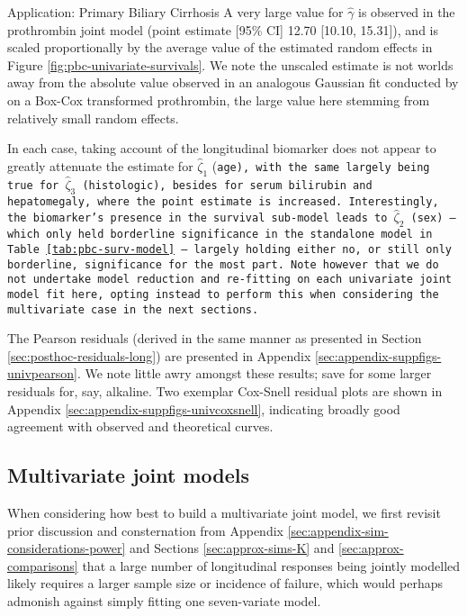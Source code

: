 \begin{chapter}{\label{cha:app-PBC}Application: Primary Biliary Cirrhosis}
  A very large value for $\hat{\gamma}$ is observed in the prothrombin joint model (point estimate [95\% CI] 12.70 [10.10, 15.31]), and is scaled proportionally by the average value of the estimated random effects in Figure \ref{fig:pbc-univariate-survivals}. We note the unscaled estimate is not worlds away from the absolute value observed in an analogous Gaussian fit conducted by \citet{Hickey2018} on a Box-Cox transformed prothrombin, the large value here stemming from relatively small random effects.

  In each case, taking account of the longitudinal biomarker does not appear to greatly attenuate the estimate for $\hat{\zeta}_1$ (\tt{age}), with the same largely being true for $\hat{\zeta}_3$ (\tt{histologic}), besides for serum bilirubin and hepatomegaly, where the point estimate is increased. Interestingly, the biomarker's presence in the survival sub-model leads to $\hat{\zeta}_2$ (\tt{sex}) -- which only held borderline significance in the standalone model in Table \ref{tab:pbc-surv-model} -- largely holding either no, or still only borderline, significance for the most part. Note however that we do not undertake model reduction and re-fitting on each univariate joint model fit here, opting instead to perform this when considering the multivariate case in the next sections.
  
  The Pearson residuals (derived in the same manner as presented in Section \ref{sec:posthoc-residuals-long}) are presented in Appendix \ref{sec:appendix-suppfigs-univpearson}. We note little awry amongst these results; save for some larger residuals for, say, alkaline. Two exemplar Cox-Snell residual plots are shown in Appendix \ref{sec:appendix-suppfigs-univcoxsnell}, indicating broadly good agreement with observed and theoretical curves.
  
  \subsection{Multivariate joint models}\label{sec:pbc-jointmodelling-multivs}
  \rmtoc
  When considering how best to build a multivariate joint model, we first revisit prior discussion and consternation from Appendix \ref{sec:appendix-sim-considerations-power} and Sections \ref{sec:approx-sims-K} and \ref{sec:approx-comparisons} that a large number of longitudinal responses being jointly modelled likely requires a larger sample size or incidence of failure, which would perhaps admonish against simply fitting one seven-variate model.


\end{chapter}
